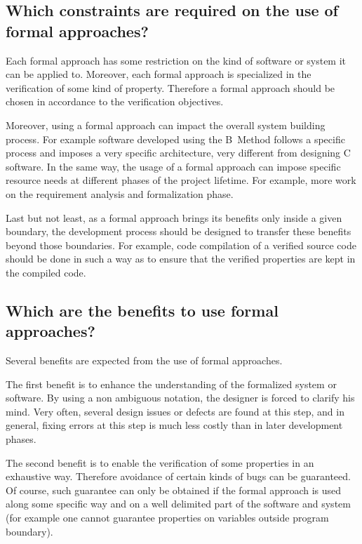 \subsection{Which constraints are required on the use of formal approaches?}

Each formal approach has some restriction on the kind of software or
system it can be applied to. Moreover, each formal approach is
specialized in the verification of some kind of property. Therefore a
formal approach should be chosen in accordance to the verification
objectives.

Moreover, using a formal approach can impact the overall system building
process. For example software developed using the B~Method follows a
specific process and imposes a very specific architecture, very different
from designing C software. In the same way, the usage of a formal
approach can impose specific resource needs at different phases of the
project lifetime. For example, more work on the requirement analysis and
formalization phase.

Last but not least, as a formal approach brings its benefits only inside
a given boundary, the development process should be designed to transfer
these benefits beyond those boundaries. For example, code compilation of
a verified source code should be done in such a way as to ensure that
the verified properties are kept in the compiled code.

\subsection{Which are the benefits to use formal approaches?}

Several benefits are expected from the use of formal approaches.

The first benefit is to enhance the understanding of the formalized
system or software. By using a non ambiguous notation, the designer is
forced to clarify his mind. Very often, several design issues or defects
are found at this step, and in general, fixing errors at this step is
much less costly than in later development phases.

The second benefit is to enable the verification of some properties in
an exhaustive way. Therefore avoidance of certain kinds of bugs can be
guaranteed. Of course, such guarantee can only be obtained if the
formal approach is used along some specific way and on a well delimited
part of the software and system (for example one cannot guarantee
properties on variables outside program boundary).

